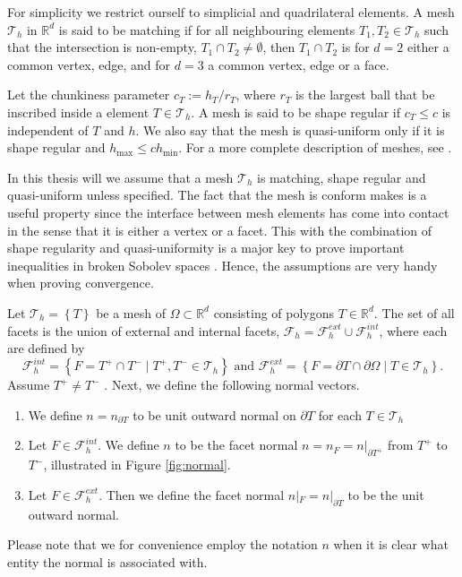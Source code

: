 For simplicity we restrict ourself to simplicial and quadrilateral elements.
A mesh $\mathcal{T}_{h}$ in $ \mathbb{R} ^{d}$ is said to be matching if
for all neighbouring elements $T_{1}, T_{2} \in \mathcal{T} _{h}$ such that the intersection is non-empty, $T_{1} \cap T_{2} \neq \emptyset  $, then $T_{1}\cap T_{2}$ is for $d=2$ either a common vertex, edge, and for $d=3$ a common vertex, edge or a face.

Let the chunkiness parameter $c_{T} := h_{T}/r_{T}$, where $r_{T}$  is the largest ball that be inscribed inside a element $T \in \mathcal{T}_{h} $.
A mesh is said to be shape regular if $c_{T}\le  c$ is independent of $T$  and $h$. We also say that the mesh is quasi-uniform only if it is shape regular and $h_{\mathrm{ max }} \le  c h_{\mathrm{ min }}$.
For a more complete description of meshes, see \cite[Chapter 8]{ErnGuermond2021}.

In this thesis will we assume that a mesh $\mathcal{T}_{h} $ is matching, shape regular and quasi-uniform unless specified.
 The fact that the mesh is conform makes is a useful property since the interface between mesh elements has come into contact in the sense
that it is either a vertex or a facet. This with the combination of shape regularity and quasi-uniformity is a major key to prove important inequalities in broken Sobolev spaces \cite[Chapter 1.4.1]{pietro2012}. Hence, the assumptions are very handy when proving convergence.


Let $\mathcal{T}_{h}  = \left\{ T \right\} $ be a mesh of $\Omega \subset  \mathbb{R} ^d $ consisting of polygons $T \in \mathbb{R} ^{d}$.
The set of all facets is the union of external and internal facets, $\mathcal{F} _{h} = \mathcal{F} ^{ext}_{h} \cup \mathcal{F} _{h}^{int} $, where each are defined by
\[
            \mathcal{F}^{int} _{h}  = \left\{ F=T^{+}\cap T^{-}  \mid  T^{+}, T^{-} \in \mathcal{T}_{h}  \right\} \text{ and }
            \mathcal{F}^{ext} _{h}  = \left\{ F= \partial T \cap \partial \Omega    \mid  T  \in \mathcal{T}_{h}  \right\}.
\]
Assume $T^{+} \neq T^{-}$ . Next, we define the following normal vectors.
\begin{enumerate}[label=\arabic*)]
    \item We define $ n= n  _{\partial T}$ to be unit outward normal on $\partial T$ for each $T \in \mathcal{T}_{h} $
\item Let $F \in \mathcal{F }^{int} _{h}$. We define $n$ to be the facet normal $ n =  n _F = n | _{\partial T^{+}} $  from $T^{+}$ to $T^{-}$, illustrated in Figure \ref{fig:normal}.
 \item Let $F \in \mathcal{F} ^{ext}_{h}$. Then we define the facet normal $n | _{F} = n | _{\partial T} $ to be the unit outward normal.
\end{enumerate}
Please note that we for convenience employ the notation $n$ when it is clear what entity the normal is associated with.

